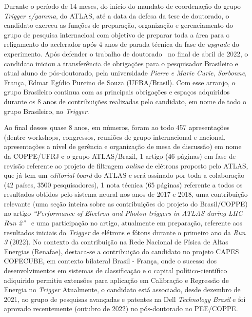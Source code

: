 Durante o período de 14 meses, do início do mandato de coordenação do grupo \emph{Trigger e/gamma}, do ATLAS, até 
a data da defesa da tese de doutorado, o candidato exerceu as funções de preparação, organização 
e gerenciamento do grupo de pesquisa internacioal com objetivo de preparar toda a área para o religamento do 
acelerador após 4 anos de parada técnica da fase de \emph{upgrade} do experimento. 
Após defender o trabalho de doutorado~\cite{tese_joao} no 
final de abril de 2022, o candidato iniciou a transferência de obrigações para o pesquisador Brasileiro e 
atual aluno de pós-doutorado, pela universidade \emph{Pierre e Marie Curie}, \emph{Sorbonne}, França, Edmar Egídio 
Purcino de Souza (UFBA/Brasil). Com esse arranjo, o grupo Brasileiro continua com as principais obrigações 
e espaços adquiridos durante os 8 anos de contribuições realizadas pelo candidato, em nome de todo o grupo 
Brasileiro, no \emph{Trigger}. 


Ao final desses quase 8 anos, em números, foram ao todo 457 apresentações (dentre workshops, congressos, reuniões 
de grupo internacional e nacional, apresentações a nível de gerência e organização de mesa de discussão) em 
nome da COPPE/UFRJ e o grupo ATLAS/Brazil, 1 artigo (46 páginas) em fase de revisão referente ao projeto de 
filtragem \emph{online} de elétrons proposto pelo ATLAS, que já tem um \emph{editorial board} do ATLAS e será assinado 
por toda a colaboração (42 países, 3500 pesquisadores), 1 nota técnica (65 páginas) referente a todos os 
resultados obtidos pelo sistema neural nos anos de 2017 e 2018, uma contribuição relevante (uma seção inteira 
sobre as contribuições do projeto do Brasil/COPPE) no artigo \emph{“Performance of Electron and Photon triggers 
in ATLAS during LHC Run 2”}~\cite{paper_egamma_run2} e uma participação no artigo, atualmente em 
preparação, referente aos resultados 
iniciais do \emph{Trigger} de elétrons e fótons durante o primeiro ano da \emph{Run 3} (2022). 
No contexto da contribuição na Rede Nacional de Física de Altas Energias (Renafae), destaca-se a contribuição
do candidato no projeto CAPES COFECUBE, em contexto bilateral Brasil - França, onde o sucesso dos 
desenvolvimentos em sistemas de classificação e o capital político-científico adiquirido 
permitiu extensões para aplicação em Calibração e Regressão de Energia no \emph{Trigger}
Atualmente, o candidato está 
associado, desde dezembro de 2021, ao grupo de pesquisas avançadas e patentes na Dell \emph{Technology Brasil} e foi 
aprovado recentemente (outubro de 2022) no pós-doutorado no PEE/COPPE.



